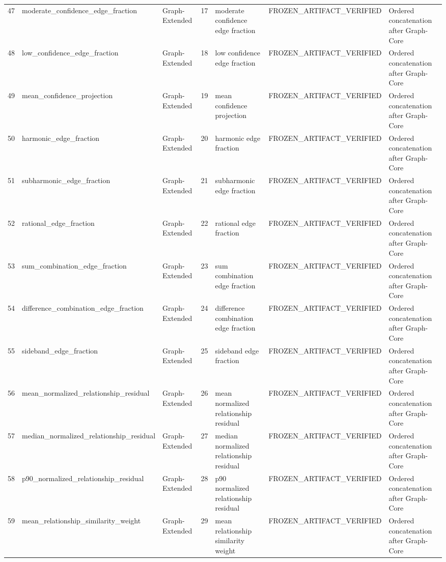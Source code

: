 \begin{longtable}{lllllll}
47 & moderate\_confidence\_edge\_fraction & Graph-Extended & 17 & moderate confidence edge fraction & FROZEN\_ARTIFACT\_VERIFIED & Ordered concatenation after Graph-Core \\
48 & low\_confidence\_edge\_fraction & Graph-Extended & 18 & low confidence edge fraction & FROZEN\_ARTIFACT\_VERIFIED & Ordered concatenation after Graph-Core \\
49 & mean\_confidence\_projection & Graph-Extended & 19 & mean confidence projection & FROZEN\_ARTIFACT\_VERIFIED & Ordered concatenation after Graph-Core \\
50 & harmonic\_edge\_fraction & Graph-Extended & 20 & harmonic edge fraction & FROZEN\_ARTIFACT\_VERIFIED & Ordered concatenation after Graph-Core \\
51 & subharmonic\_edge\_fraction & Graph-Extended & 21 & subharmonic edge fraction & FROZEN\_ARTIFACT\_VERIFIED & Ordered concatenation after Graph-Core \\
52 & rational\_edge\_fraction & Graph-Extended & 22 & rational edge fraction & FROZEN\_ARTIFACT\_VERIFIED & Ordered concatenation after Graph-Core \\
53 & sum\_combination\_edge\_fraction & Graph-Extended & 23 & sum combination edge fraction & FROZEN\_ARTIFACT\_VERIFIED & Ordered concatenation after Graph-Core \\
54 & difference\_combination\_edge\_fraction & Graph-Extended & 24 & difference combination edge fraction & FROZEN\_ARTIFACT\_VERIFIED & Ordered concatenation after Graph-Core \\
55 & sideband\_edge\_fraction & Graph-Extended & 25 & sideband edge fraction & FROZEN\_ARTIFACT\_VERIFIED & Ordered concatenation after Graph-Core \\
56 & mean\_normalized\_relationship\_residual & Graph-Extended & 26 & mean normalized relationship residual & FROZEN\_ARTIFACT\_VERIFIED & Ordered concatenation after Graph-Core \\
57 & median\_normalized\_relationship\_residual & Graph-Extended & 27 & median normalized relationship residual & FROZEN\_ARTIFACT\_VERIFIED & Ordered concatenation after Graph-Core \\
58 & p90\_normalized\_relationship\_residual & Graph-Extended & 28 & p90 normalized relationship residual & FROZEN\_ARTIFACT\_VERIFIED & Ordered concatenation after Graph-Core \\
59 & mean\_relationship\_similarity\_weight & Graph-Extended & 29 & mean relationship similarity weight & FROZEN\_ARTIFACT\_VERIFIED & Ordered concatenation after Graph-Core \\

\end{longtable}
